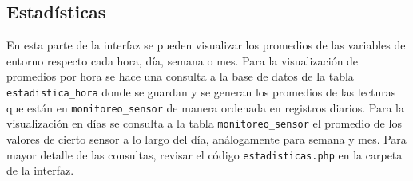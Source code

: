 \documentclass[a4paper,10pt,titlepage]{article}
\begin{document}
\subsection{Estad\'isticas}
En esta parte de la interfaz se pueden visualizar los promedios de las variables de entorno respecto cada hora, d\'ia, semana o mes. Para la visualizaci\'on de promedios 
por hora se hace una consulta a la base de datos de la tabla \verb|estadistica_hora| donde se guardan y se generan los promedios de las lecturas que est\'an en 
\verb|monitoreo_sensor| de manera ordenada en registros diarios. Para la visualizaci\'on en d\'ias se consulta a la tabla \verb|monitoreo_sensor| el promedio de los 
valores de cierto sensor a lo largo del d\'ia, an\'alogamente para semana y mes. Para mayor detalle de las consultas, revisar el c\'odigo \verb|estadisticas.php| 
en 
la carpeta de la interfaz.
\end{document}
